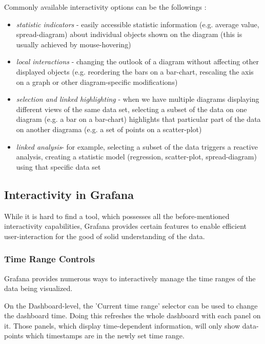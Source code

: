 Commonly available interactivity options can be the followings \cite{visual-analysis}:
\begin{itemize}
	\item \emph{statistic indicators} - easily accessible statistic information (e.g. average value, spread-diagram) about individual objects shown on the diagram (this is usually achieved by mouse-hovering)
	\item \emph{local interactions} - changing the outlook of a diagram without affecting other displayed objects (e.g. reordering the bars on a bar-chart, rescaling the axis on a graph or other diagram-specific modifications)
	\item \emph{selection and linked highlighting} - when we have multiple diagrams displaying different views of the same data set, selecting a subset of the data on one diagram (e.g. a bar on a bar-chart) highlights that particular part of the data on another diagrama (e.g. a set of points on a scatter-plot)
	\item \emph{linked analysis}- for example, selecting a subset of the data triggers a reactive analysis, creating a statistic model (regression, scatter-plot, spread-diagram) using that specific data set
\end{itemize}

\subsection{Interactivity in Grafana}

While it is hard to find a tool, which possesses all the before-mentioned interactivity capabilities, Grafana provides certain features to enable efficient user-interaction for the good of solid understanding of the data.


\subsubsection{Time Range Controls}

Grafana provides numerous ways to interactively manage the time ranges of the data being visualized. \cite{grafana-time-range-controls}

On the Dashboard-level, the 'Current time range' selector can be used to change the dashboard time. Doing this refreshes the whole dashboard with each panel on it. Those panels, which display time-dependent information, will only show data-points which timestamps are in the newly set time range.

